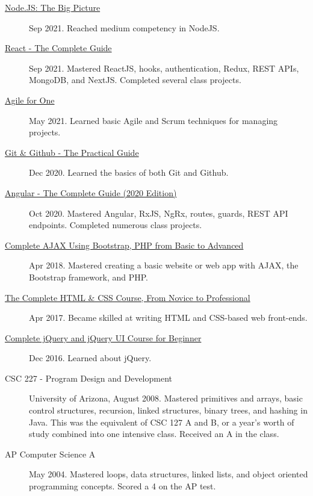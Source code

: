 \documentclass{article}
\begin{document}
\begin{description}
  \item [\href{https://sirkoik.github.io/CurriculumVitae/certifications/Nodejs-The-Big-Picture/certificate.pdf}{Node.JS: The Big Picture}] Sep 2021. Reached medium competency in NodeJS.
  \item [\href{https://www.udemy.com/certificate/UC-2196f0cf-2dce-4a11-9d8e-421827506ad1/}{React - The Complete Guide}] Sep 2021. Mastered ReactJS, hooks, authentication, Redux, REST APIs, MongoDB, and NextJS. Completed several class projects.
  \item [\href{https://sirkoik.github.io/CurriculumVitae/certifications/Agile-for-One/certificate.pdf}{Agile for One}] May 2021. Learned basic Agile and Scrum techniques for managing projects.
  \item [\href{https://sirkoik.github.io/CurriculumVitae/certifications/certificate-of-completion-for-git-github-the-practical-guide.pdf}{Git \& Github - The Practical Guide}] Dec 2020. Learned the basics of both Git and Github.
  \item [\href{https://www.udemy.com/certificate/UC-624f6f83-940e-428f-accd-d16113661ded}{Angular - The Complete Guide (2020 Edition)}] Oct 2020. Mastered Angular, RxJS, NgRx, routes, guards, REST API endpoints. Completed numerous class projects.
  \item [\href{https://www.udemy.com/certificate/UC-E3EMJE4O}{Complete AJAX Using Bootstrap, PHP from Basic to Advanced}] Apr 2018. Mastered creating a basic website or web app with AJAX, the Bootstrap framework, and PHP.
  \item [\href{https://www.udemy.com/certificate/UC-QZDWYX3V}{The Complete HTML \& CSS Course, From Novice to Professional}] Apr 2017. Became skilled at writing HTML and CSS-based web front-ends.
  \item [\href{https://www.udemy.com/certificate/UC-4V285L2N}{Complete jQuery and jQuery UI Course for Beginner}] Dec 2016. Learned about jQuery.
  \item [CSC 227 - Program Design and Development] University of Arizona, August 2008. Mastered primitives and arrays, basic control structures, recursion, linked structures, binary trees, and hashing in Java. This was the equivalent of CSC 127 A and B, or a year's worth of study combined into one intensive class. Received an A in the class.
  \item [AP Computer Science A] May 2004. Mastered loops, data structures, linked lists, and object oriented programming concepts. Scored a 4 on the AP test.
\end{description}
\end{document}
